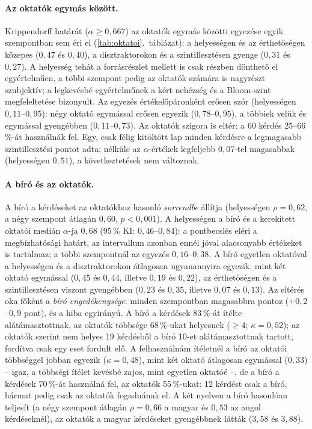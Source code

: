 \paragraph{Az oktatók egymás között.} Krippendorff határát ($\alpha\ge0{,}667$) az oktatók egymás közötti
egyezése egyik szempontban sem éri el (\ref{tab:oktatoi}.~táblázat): a helyességen és az érthetőségen
közepes ($0{,}47$ és $0{,}40$), a disztraktorokon és a szintillesztésen gyenge ($0{,}31$ és $0{,}27$). A
helyesség tehát a forrásrészlet mellett is csak részben dönthető el egyértelműen, a többi szempont pedig az
oktatók számára is nagyrészt szubjektív; a legkevésbé egyértelműnek a kért nehézség és a Bloom-szint
megfeleltetése bizonyult. Az egyezés értékelőpáronként erősen szór (helyességen $0{,}11$--$0{,}95$): négy
oktató egymással erősen egyezik ($0{,}78$--$0{,}95$), a többiek velük és egymással gyengébben
($0{,}11$--$0{,}73$). Az oktatók szigora is eltér: a 60 kérdés 25--66\,\%-át használnák fel. Egy, csak
félig kitöltött lap minden kérdésre a legmagasabb szintillesztési pontot adta; nélküle az $\alpha$-értékek
legfeljebb $0{,}07$-tel magasabbak (helyességen $0{,}51$), a következtetések nem változnak.

\paragraph{A bíró és az oktatók.} A bíró a kérdéseket az oktatókhoz hasonló \emph{sorrendbe} állítja
(helyességen $\rho=0{,}62$, a négy szempont átlagán $0{,}60$, $p<0{,}001$). A helyességen a bíró és a
kerekített oktatói medián $\alpha$-ja $0{,}68$ (95\,\% KI: $0{,}46$--$0{,}84$): a pontbecslés eléri a
megbízhatósági határt, az intervallum azonban ennél jóval alacsonyabb értékeket is tartalmaz; a többi
szempontnál az egyezés $0{,}16$--$0{,}38$. A bíró egyetlen oktatóval a helyességen és a disztraktorokon
átlagosan ugyanannyira egyezik, mint két oktató egymással ($0{,}45$ és $0{,}44$, illetve $0{,}19$ és
$0{,}22$), az érthetőségen és a szintillesztésen viszont gyengébben ($0{,}23$ és $0{,}35$, illetve $0{,}07$ és
$0{,}13$). Az eltérés oka főként a \emph{bíró engedékenysége}: minden szempontban magasabbra pontoz
($+0{,}2$--$0{,}9$ pont), és a hiba egyirányú. A bíró a kérdések 83\,\%-át ítélte alátámasztottnak, az
oktatók többsége 68\,\%-ukat helyesnek ($\ge4$; $\kappa=0{,}52$); az oktatók szerint nem helyes 19 kérdésből a
bíró 10-et alátámasztottnak tartott, fordítva csak egy eset fordult elő. A felhasználnám ítéletnél a bíró az
oktatói többséggel jobban egyezik ($\kappa=0{,}48$), mint két oktató átlagosan egymással ($0{,}33$) -- igaz, a
többségi ítélet kevésbé zajos, mint egyetlen oktatóé --, de a bíró a kérdések 70\,\%-át használná fel, az
oktatók 55\,\%-ukat: 12 kérdést csak a bíró, hármat pedig csak az oktatók fogadnának el. A két nyelven a bíró
hasonlóan teljesít (a négy szempont átlagán $\rho=0{,}66$ a magyar és $0{,}53$ az angol kérdéseknél), az
oktatók a magyar kérdéseket gyengébbnek látták ($3{,}58$ és $3{,}88$).


